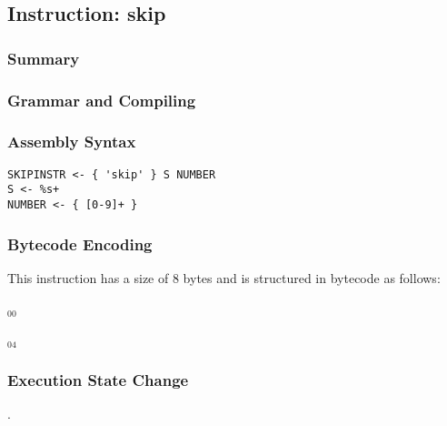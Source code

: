 \subsection{Instruction: skip}

\subsubsection{Summary}


\subsubsection{Grammar and Compiling}


\subsubsection{Assembly Syntax}

\begin{myquote}
\begin{verbatim}
SKIPINSTR <- { 'skip' } S NUMBER
S <- %s+
NUMBER <- { [0-9]+ }
\end{verbatim}
\end{myquote}

\subsubsection{Bytecode Encoding}

This instruction has a size of 8 bytes and is structured in bytecode as follows:

$_{00}$\ 



$_{04}$\ 


\subsubsection{Execution State Change}

.


